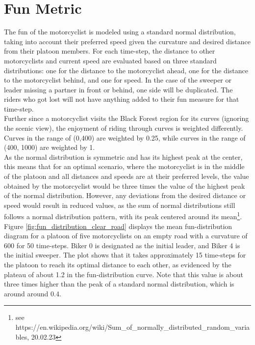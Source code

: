 \section{Fun Metric}
\label{sec:Fun Metric}
The fun of the motorcyclist is modeled using a standard normal distribution, taking into account their preferred speed given the curvature and desired distance from their platoon members. For each time-step, the distance to other motorcyclists and current speed are evaluated based on three standard distributions: one for the distance to the motorcyclist ahead, one for the distance to the motorcyclist behind, and one for speed. In the case of the sweeper or leader missing a partner in front or behind, one side will be duplicated. The riders who got lost will not have anything added to their fun measure for that time-step. \\

Further since a motorcyclist visits the Black Forest region for its curves (ignoring the scenic view), the enjoyment of riding through curves is weighted differently. Curves in the range of (0,400) are weighted by 0.25, while curves in the range of (400, 1000) are weighted by 1.\\

As the normal distribution is symmetric and has its highest peak at the center, this means that for an optimal scenario, where the motorcyclist is in the middle of the platoon and all distances and speeds are at their preferred levels, the value obtained by the motorcyclist would be three times the value of the highest peak of the normal distribution. However, any deviations from the desired distance or speed would result in reduced values, as the sum of normal distributions still follows a normal distribution pattern, with its peak centered around its mean\footnote{see https://en.wikipedia.org/wiki/Sum\_of\_normally\_distributed\_random\_variables, 20.02.23}. Figure \ref{fig:fun_distribution_clear_road} displays the mean fun-distribution diagram for a platoon of five motorcyclists on an empty road with a curvature of 600 for 50 time-steps. Biker 0 is designated as the initial leader, and Biker 4 is the initial sweeper. The plot shows that it takes approximately 15 time-steps for the platoon to reach its optimal distance to each other, as evidenced by the plateau of about 1.2 in the fun-distribution curve. Note that this value is about three times higher than the peak of a standard normal distribution, which is around around 0.4.\\

